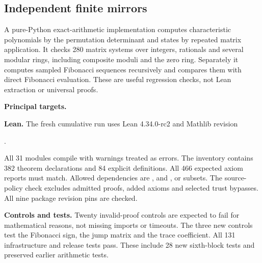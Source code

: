 \subsection*{Independent finite mirrors}
A pure-Python exact-arithmetic implementation computes characteristic polynomials by the permutation determinant and states by repeated matrix application. It checks 280 matrix systems over integers, rationals and several modular rings, including composite moduli and the zero ring. Separately it computes sampled Fibonacci sequences recursively and compares them with direct Fibonacci evaluation. These are useful regression checks, not Lean extraction or universal proofs.

\textbf{Principal targets.}\par
{}\par
{}\par
{}\par
{}\par
{}
\par\medskip
{}
\textbf{Lean.} The fresh cumulative run uses Lean 4.34.0-rc2 and Mathlib revision
\begin{center}\small{}.\end{center}
All 31 modules compile with warnings treated as errors. The inventory contains 382 theorem declarations and 84 explicit definitions. All 466 expected axiom reports must match. Allowed dependencies are ,  and , or subsets. The source-policy check excludes admitted proofs, added axioms and selected trust bypasses. All nine package revision pins are checked.

\textbf{Controls and tests.} Twenty invalid-proof controls are expected to fail for mathematical reasons, not missing imports or timeouts. The three new controls test the Fibonacci sign, the jump matrix and the trace coefficient. All 131 infrastructure and release tests pass. These include 28 new sixth-block tests and preserved earlier arithmetic tests.


